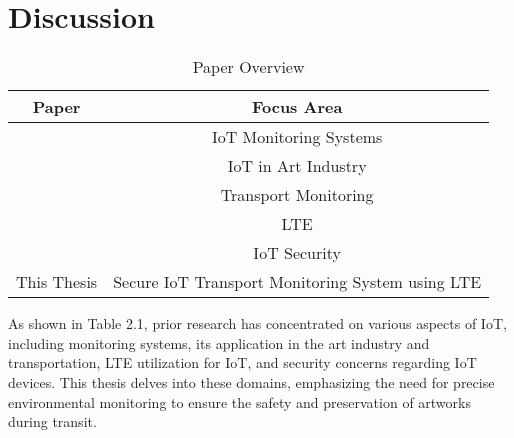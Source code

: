 \section{Discussion}

\begin{table}[H]
    \centering
    \begin{tabular}{|c|c|} \hline 
        \textbf{Paper} & \textbf{Focus Area}\\
        \hline
        [19, 29, 18, 11] & IoT Monitoring Systems\\ \hline 
        [23, 3, 10, 1, 6] & IoT in Art Industry\\ \hline 
        [38] & Transport Monitoring\\ \hline 
        [4, 20] & LTE\\ \hline 
        [9, 15, 7, 16] & IoT Security\\ \hline 
        This Thesis & Secure IoT Transport Monitoring System using LTE\\ \hline
    \end{tabular}
    \caption{Paper Overview}
    \label{tab:Paper Overview}
\end{table}

As shown in Table 2.1, prior research has concentrated on various aspects of IoT, including monitoring systems, its application in the art industry and transportation, LTE utilization for IoT, and security concerns regarding IoT devices. This thesis delves into these domains, emphasizing the need for precise environmental monitoring to ensure the safety and preservation of artworks during transit.